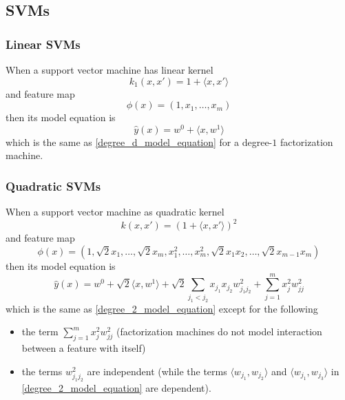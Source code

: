 \documentclass[14pt, reqno]{amsart}
\theoremstyle{definition}
\begin{document}
\vfill
\pagebreak

\subsection{SVMs} 
\subsubsection{Linear SVMs} When a support vector machine has linear kernel
$$k_1(x, x') = 1 + \langle x, x' \rangle$$
and feature map
$$\phi(x) = (1, x_1, \dots , x_m)$$
then its model equation is
$$\hat{y}(x) = w^0 + \langle x, w^1 \rangle$$
which is the same as \eqref{degree_d_model_equation} for a degree-$1$ factorization machine.

\subsubsection{Quadratic SVMs} When a support vector machine as quadratic kernel
$$k(x, x') = (1 + \langle x, x' \rangle)^2$$
and feature map
$$\phi(x) = (1, \sqrt{2} x_1, \dots , \sqrt{2} x_m, x_1^2, \dots , x_m^2, \sqrt{2} x_1x_2, \dots , \sqrt{2}x_{m-1}x_m)$$
then its model equation is
$$\hat{y}(x) = w^0 + \sqrt{2} \langle x, w^1 \rangle + \sqrt{2} \sum\limits_{j_1 < j_2} x_{j_1} x_{j_2} w_{j_1 j_2}^2 + \sum\limits_{j = 1}^m x_j^2 w_{jj}^2$$
which is the same as \eqref{degree_2_model_equation} except for the following
\begin{itemize}
\item the term $\sum\limits_{j = 1}^m x_j^2 w_{jj}^2$ (factorization machines do not model interaction between a feature with itself)
\item the terms $w_{j_1 j_2}^2$ are independent (while the terms $\langle w_{j_1}, w_{j_2} \rangle$ and $\langle w_{j_1}, w_{j_3} \rangle$ in \eqref{degree_2_model_equation} are dependent).
\end{itemize}

\vfill
\pagebreak
\end{document}
